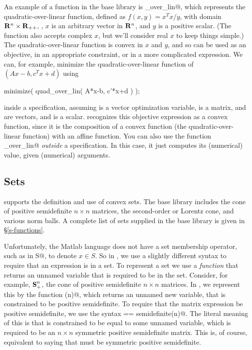 \documentclass[12pt]{article}
\newcommand{\symm}{{\mbox{\bf S}}}  %
\begin{document}
An example of a function in the base library is
\verb@quad_over_lin@, which represents the
quadratic-over-linear function, defined as $f(x,y)=x^Tx/y$,
with domain $\R^n \times \R_{++}$, \ie,
$x$ is an arbitrary vector in $\R^n$, and $y$ is a positive
scalar.  (The function also accepts
complex $x$, but we'll consider real $x$ to keep things simple.)
The quadratic-over-linear function is convex in 
$x$ and $y$, and so can be 
used as an objective, in an appropriate constraint, or in a 
more complicated expression.
We can, for example, minimize the quadratic-over-linear
function of $(Ax-b,c^Tx+d)$ using
\begin{code}
	minimize( quad_over_lin( A*x-b, c'*x+d ) );
\end{code}
inside a \cvx specification,
assuming \verb@x@ is a vector optimization variable,
\verb@A@ is a matrix, \verb@b@
and \verb@c@ are vectors, and \verb@d@ is a scalar.
\cvx recognizes this objective expression as a convex 
function, since it is
the composition of a convex function (the quadratic-over-linear
function) with an affine function.
You can also use the function \verb@quad_over_lin@ \emph{outside}
a \cvx specification.   In this case, it just computes its (numerical)
value, given (numerical) arguments.

\subsection{Sets}
\label{sec:sets}

\cvx supports the definition and use of convex sets.
The base library includes the cone of 
positive semidefinite $n \times n$ matrices,
the second-order or Lorentz cone, and various norm balls.
A complete list of sets supplied in the base library is given in 
\S\ref{s-functions}.

Unfortunately, the Matlab language does not have a 
set membership operator, such as \verb@x in S@, to denote $x \in S$.  
So in \cvx, we use a slightly different syntax to require
that an expression is in a set.
To represent a set we use a \emph{function} that returns
an unnamed variable that is required to be in the set.
Consider, for example, $\symm^n_+$, the cone of 
positive semidefinite $n \times n$ matrices.
In \cvx, we represent this by the function \verb@semidefinite(n)@,
which returns an unnamed new variable, that is constrained to be
positive semidefinite.
To require that the matrix expression \verb@X@ 
be positive semidefinite, we use the syntax \verb@X == semidefinite(n)@.
The literal meaning of this is that \verb@X@ is constrained to be 
equal to some unnamed variable, which is required to be 
an $n \times n$ symmetric positive semidefinite matrix. 
This is, of course, equivalent to saying that \verb@X@ must be
symmetric positive semidefinite.
\end{document}
